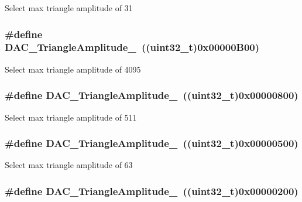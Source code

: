\label{group__DAC__lfsrunmask__triangleamplitude_ga10b15745b749c62a56bd3d7bd5a27e1b}
Select max triangle amplitude of 31 \hypertarget{group__DAC__lfsrunmask__triangleamplitude_ga3ce69f5a63a2464dc4b5f73cb6fe72f5}{
\subsubsection[{DAC\_\-TriangleAmplitude\_\-4095}]{\setlength{\rightskip}{0pt plus 5cm}\#define DAC\_\-TriangleAmplitude\_~((uint32\_\-t)0x00000B00)}}
\label{group__DAC__lfsrunmask__triangleamplitude_ga3ce69f5a63a2464dc4b5f73cb6fe72f5}
Select max triangle amplitude of 4095 \hypertarget{group__DAC__lfsrunmask__triangleamplitude_ga565b0c97bbdf152756617d491bf8ef85}{
\subsubsection[{DAC\_\-TriangleAmplitude\_\-511}]{\setlength{\rightskip}{0pt plus 5cm}\#define DAC\_\-TriangleAmplitude\_~((uint32\_\-t)0x00000800)}}
\label{group__DAC__lfsrunmask__triangleamplitude_ga565b0c97bbdf152756617d491bf8ef85}
Select max triangle amplitude of 511 \hypertarget{group__DAC__lfsrunmask__triangleamplitude_gaaae92dae9c4da55e29c645396825e36b}{
\subsubsection[{DAC\_\-TriangleAmplitude\_\-63}]{\setlength{\rightskip}{0pt plus 5cm}\#define DAC\_\-TriangleAmplitude\_~((uint32\_\-t)0x00000500)}}
\label{group__DAC__lfsrunmask__triangleamplitude_gaaae92dae9c4da55e29c645396825e36b}
Select max triangle amplitude of 63 \hypertarget{group__DAC__lfsrunmask__triangleamplitude_gad3f31de1277836df1109576a53c47e87}{
\subsubsection[{DAC\_\-TriangleAmplitude\_\-7}]{\setlength{\rightskip}{0pt plus 5cm}\#define DAC\_\-TriangleAmplitude\_~((uint32\_\-t)0x00000200)}}
